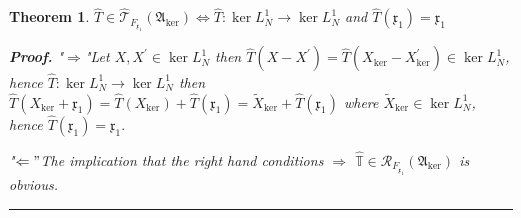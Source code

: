 \documentclass[aps,preprint]{revtex4}%
\newtheorem{theorem}{Theorem}
\newenvironment{proof}[1][Proof]{\noindent\textbf{#1.} }{\ \rule{0.5em}{0.5em}}
\begin{document}
\begin{theorem}
$\hat{T}\in\mathcal{\hat{T}}_{F_{\mathfrak{x}_{1}}}\left(  \mathfrak{A}_{\ker
}\right)  \Leftrightarrow\hat{T}:\ker L_{N}^{1}\rightarrow\ker L_{N}^{1}$ and
$\hat{T}\left(  \mathfrak{x}_{1}\right)  =\mathfrak{x}_{1}$

\begin{proof}
"$\Rightarrow$"Let $X,X^{\prime}\in\ker L_{N}^{1}$ then $\hat{T}\left(
X-X^{\prime}\right)  =\hat{T}\left(  X_{\ker}-X_{\ker}^{\prime}\right)
\in\ker L_{N}^{1}$, hence $\hat{T}:\ker L_{N}^{1}\rightarrow\ker L_{N}^{1}$
then $\hat{T}\left(  X_{\ker}+\mathfrak{x}_{1}\right)  =\hat{T}\left(
X_{\ker}\right)  +\hat{T}\left(  \mathfrak{x}_{1}\right)  =\tilde{X}_{\ker
}+\hat{T}\left(  \mathfrak{x}_{1}\right)  $ where $\tilde{X}_{\ker}\in\ker
L_{N}^{1}$, hence $\hat{T}\left(  \mathfrak{x}_{1}\right)  =\mathfrak{x}_{1}.$

"$\Leftarrow"$The implication that the right hand conditions $\Rightarrow$
$\mathbb{\hat{T}}\in\mathcal{R}_{F_{\mathfrak{x}_{1}}}\left(  \mathfrak{A}%
_{\ker}\right)  $ is obvious.
\end{proof}
\end{theorem}
\end{document}
